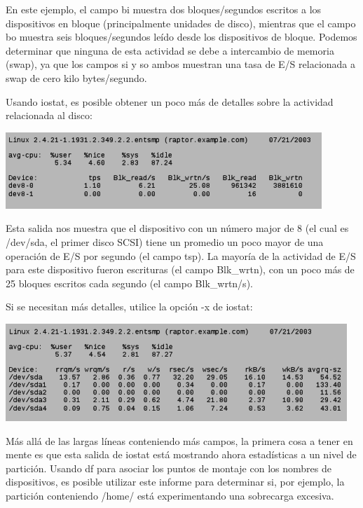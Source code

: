 \documentclass[12pt]{article}
\begin{document}
        
En este ejemplo, el campo bi muestra dos bloques/segundos escritos a los dispositivos en bloque (principalmente unidades de disco), mientras que el campo bo muestra seis bloques/segundos leído desde los dispositivos de bloque. Podemos determinar que ninguna de esta actividad se debe a intercambio de memoria (swap), ya que los campos si y so ambos muestran una tasa de E/S relacionada a swap de cero kilo bytes/segundo.

Usando iostat, es posible obtener un poco más de detalles sobre la actividad relacionada al disco:

\begin{center}
 \includegraphics{iostat1.png}
\end{center}

Esta salida nos muestra que el dispositivo con un número major de 8 (el cual es /dev/sda, el primer disco SCSI) tiene un promedio un poco mayor de una operación de E/S por segundo (el campo tsp). La mayoría de la actividad de E/S para este dispositivo fueron escrituras (el campo Blk\_wrtn), con un poco más de 25 bloques escritos cada segundo (el campo Blk\_wrtn/s).

Si se necesitan más detalles, utilice la opción -x de iostat:

\begin{center}
 \includegraphics{iostat2.png}
\end{center}

        
Más allá de las largas líneas conteniendo más campos, la primera cosa a tener en mente es que esta salida de iostat está mostrando ahora estadísticas a un nivel de partición. Usando df para asociar los puntos de montaje con los nombres de dispositivos, es posible utilizar este informe para determinar si, por ejemplo, la partición conteniendo /home/ está experimentando una sobrecarga excesiva.
\end{document}
